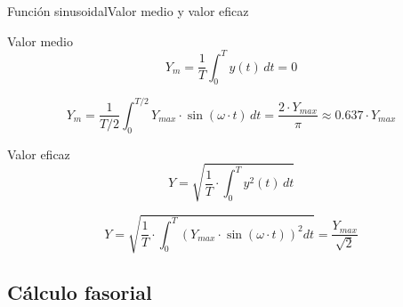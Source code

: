 \documentclass[aspectratio=169, xcolor={usenames,svgnames,dvipsnames}]{beamer}
\begin{document}
\begin{frame}{Función sinusoidal}{Valor medio y valor eficaz}
\begin{block}{Valor medio}
\[
Y_m=\frac{1}{T}\int_{0}^{T}y(t)\, dt = 0
\]

\[
Y_m=\frac{1}{T/2}\int_{0}^{T/2}Y_{max}\cdot\sin(\omega \cdot t)\, dt=\boxed{\dfrac{2\cdot Y_{max}}{\pi}\approx 0.637\cdot Y_{max}}
\]
\end{block}
\begin{block}{Valor eficaz}
\[
Y = \sqrt{\frac{1}{T}\cdot\int_{0}^{T}y^{2}(t)\, dt}
\]

\[
Y=\sqrt{\frac{1}{T}\cdot\int_{0}^{T}\left(Y_{max}\cdot\sin(\omega\cdot t)\right)^{2}dt}=\boxed{\frac{Y_{max}}{\sqrt{2}}}
\]
\end{block}
\end{frame}

\subsection{Cálculo fasorial}
\end{document}

